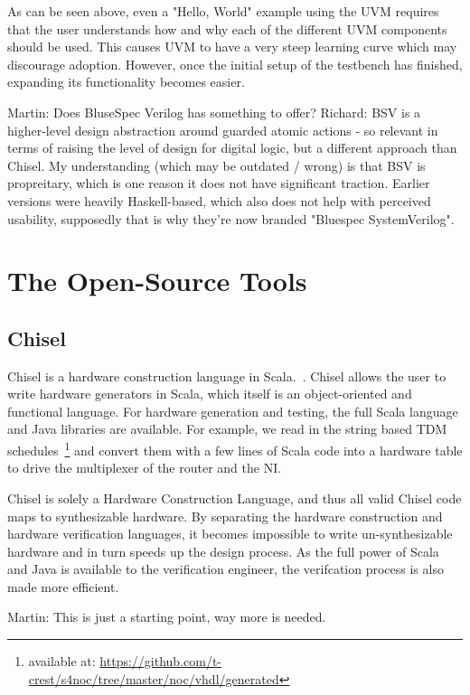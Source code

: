 \documentclass[conference]{IEEEtran}
\newcommand{\martin}[1]{{\color{blue} Martin: #1}}
\newcommand{\ducky}[1]{{\color{orange} Richard: #1}}
\begin{document}
As can be seen above, even a "Hello, World" example using the UVM requires that the user understands how and why each of the different UVM components should be used. This causes UVM to have a very steep learning curve which may discourage adoption. However, once the initial setup of the testbench has finished, expanding its functionality becomes easier.


\martin{Does BluseSpec Verilog has something to offer?}
\ducky{BSV is a higher-level design abstraction around guarded atomic actions - so relevant in terms of raising the level of design for digital logic, but a different approach than Chisel. My understanding (which may be outdated / wrong) is that BSV is propreitary, which is one reason it does not have significant traction. Earlier versions were heavily Haskell-based, which also does not help with perceived usability, supposedly that is why they're now branded "Bluespec SystemVerilog".}

\section{The Open-Source Tools}

\subsection{Chisel}

Chisel is a hardware construction language in Scala.~\cite{chisel:dac2012}.
Chisel allows the user to write hardware generators in Scala, which itself is an object-oriented and functional language. For hardware generation and testing, the full Scala language and Java
libraries are available. For example, we read in the string based TDM
schedules~\footnote{available at: \url{https://github.com/t-crest/s4noc/tree/master/noc/vhdl/generated}}
and convert them with a few lines of Scala code into a hardware table to
drive the multiplexer of the router and the NI.

Chisel is solely a Hardware Construction Language, and thus all valid Chisel code maps to synthesizable hardware. By separating the hardware construction and hardware verification languages, it becomes impossible to write un-synthesizable hardware and in turn speeds up the design process. As the full power of Scala and Java is available to the verification engineer, the verifcation process is also made more efficient.

\martin{This is just a starting point, way more is needed.}
\end{document}
